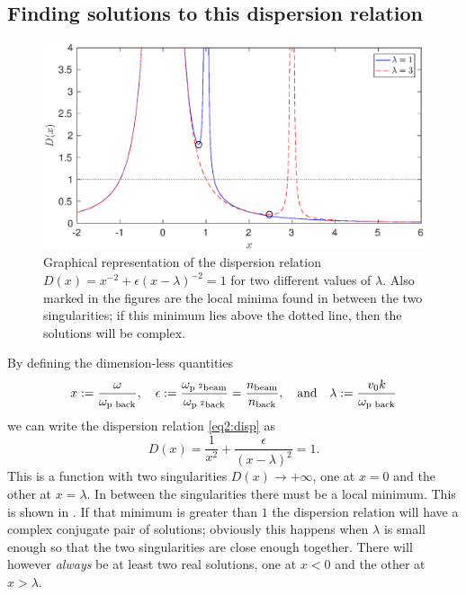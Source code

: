 \documentclass[11pt,a4paper, 
swedish, english %
]{article}
\begin{document}
\subsection*{Finding solutions to this dispersion relation}
\begin{figure}
\centering
\includegraphics[width=12cm]{disp1.eps}
\caption{Graphical representation of the dispersion relation
  $D(x)=x^{-2}+\epsilon(x-\lambda)^{-2}=1$ for two different values of
  $\lambda$. Also marked in the figures are the local minima found
  in between the two singularities; if this minimum lies above the
  dotted line, then the solutions will be complex. }
\label{fig:disp}
\end{figure}

By defining the dimension-less quantities 
\begin{equation}
x:=\frac{\omega}{\back{\omega}{\text{p }}} \qc
\epsilon := \frac{\beam{\omega}{\text{p }^2}}{\back{\omega}{\text{p }^2}} 
=\frac{\beam{n}{}}{\back{n}{}} \qc \text{and}\quad
\lambda:=\frac{v_0k}{\back{\omega}{\text{p }}} 
\end{equation}
we can write the dispersion relation \eqref{eq2:disp} as
\begin{equation}
D(x)=\frac{1}{x^2}+\frac{\epsilon}{(x-\lambda)^2}=1.
\end{equation}
This is a function with two singularities $D(x)\to+\infty$, one at
$x=0$ and the other at $x=\lambda$. In between the singularities there
must be a local minimum. This is shown in . 
If that minimum is greater than $1$ the dispersion relation will have
a complex conjugate pair of solutions; obviously this happens when
$\lambda$ is small enough so that the two singularities are close
enough together. 
There will however \emph{always} be at least two real solutions, one
at $x<0$ and the other at $x>\lambda$. 
\end{document}
